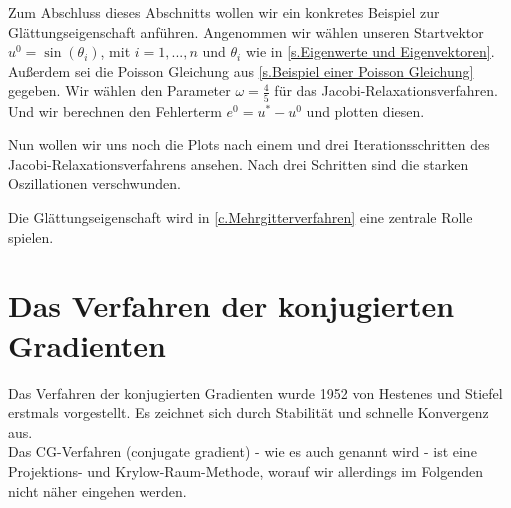 \label{img.Jacobi3}

Zum Abschluss dieses Abschnitts wollen wir ein konkretes Beispiel zur Glättungseigenschaft anführen. Angenommen wir wählen unseren Startvektor $u^{0} = \sin(\theta_{i})$, mit $i = 1,...,n$ und $\theta_{i}$ wie in \autoref{s.Eigenwerte und Eigenvektoren}. Außerdem sei die Poisson Gleichung aus \autoref{s.Beispiel einer Poisson Gleichung} gegeben. Wir wählen den Parameter $\omega = \frac{4}{5}$ für das Jacobi-Relaxationsverfahren. Und wir berechnen den Fehlerterm $e^{0} = u^{*} - u^{0}$ und plotten diesen.


Nun wollen wir uns noch die Plots nach einem und drei Iterationsschritten des Jacobi-Relaxationsverfahrens ansehen. Nach drei Schritten sind die starken Oszillationen verschwunden.


Die Glättungseigenschaft wird in \autoref{c.Mehrgitterverfahren} eine zentrale Rolle spielen.

\section{Das Verfahren der konjugierten Gradienten}\label{s.Das Verfahren der konjugierten Gradienten}

Das Verfahren der konjugierten Gradienten wurde 1952 von Hestenes und Stiefel erstmals vorgestellt. Es zeichnet sich durch Stabilität und schnelle Konvergenz aus. \\
Das CG-Verfahren (conjugate gradient) - wie es auch genannt wird - ist eine Projektions- und Krylow-Raum-Methode, worauf wir allerdings im Folgenden nicht näher eingehen werden.


